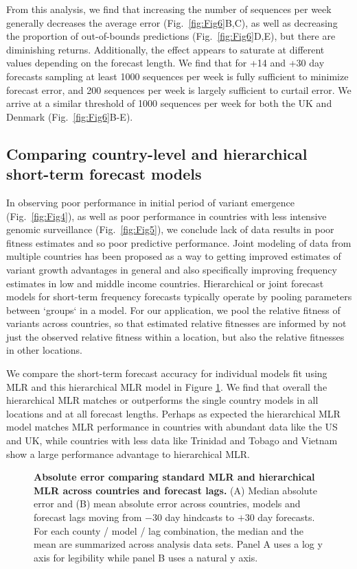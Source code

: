 \documentclass[10pt,letterpaper]{article}
\begin{document}
From this analysis, we find that increasing the number of sequences per week generally decreases the average error (Fig.~\ref{fig:Fig6}B,C), as well as decreasing the proportion of out-of-bounds predictions (Fig.~\ref{fig:Fig6}D,E), but there are diminishing returns.
Additionally, the effect appears to saturate at different values depending on the forecast length.
We find that for +14 and +30 day forecasts sampling at least 1000 sequences per week is fully sufficient to minimize forecast error, and 200 sequences per week is largely sufficient to curtail error.
We arrive at a similar threshold of 1000 sequences per week for both the UK and Denmark (Fig.~\ref{fig:Fig6}B-E).


\subsection*{Comparing country-level and hierarchical short-term forecast models}

In observing poor performance in initial period of variant emergence (Fig.\ \ref{fig:Fig4}), as well as poor performance in countries with less intensive genomic surveillance (Fig.\ \ref{fig:Fig5}), we conclude lack of data results in poor fitness estimates and so poor predictive performance.
Joint modeling of data from multiple countries has been proposed as a way to getting improved estimates of variant growth advantages in general and also specifically improving frequency estimates in low and middle income countries.
Hierarchical or joint forecast models for short-term frequency forecasts typically operate by pooling parameters between `groups` in a model.
For our application, we pool the relative fitness of variants across countries, so that estimated relative fitnesses are informed by not just the observed relative fitness within a location, but also the relative fitnesses in other locations.

We compare the short-term forecast accuracy for individual models fit using MLR and this hierarchical MLR model in Figure \ref{fig:Fig7}.
We find that overall the hierarchical MLR matches or outperforms the single country models in all locations and at all forecast lengths.
Perhaps as expected the hierarchical MLR model matches MLR performance in countries with abundant data like the US and UK, while countries with less data like Trinidad and Tobago and Vietnam show a large performance advantage to hierarchical MLR.


\begin{figure}[h!]
	\centering
	\caption{\textbf{Absolute error comparing standard MLR and hierarchical MLR across countries and forecast lags.}
	(A) Median absolute error and (B) mean absolute error across countries, models and forecast lags moving from $-30$ day hindcasts to $+30$ day forecasts.
	For each county / model / lag combination, the median and the mean are summarized across analysis data sets.
	Panel A uses a log y axis for legibility while panel B uses a natural y axis.
	}
	\label{fig:Fig7}
\end{figure}
\end{document}
